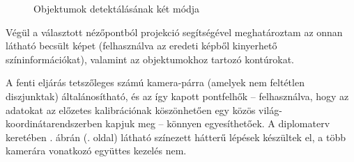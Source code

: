 \begin{figure}[b]

\caption{Objektumok detektálásának két módja \label{fig:plan-objects}}
\end{figure}



Végül a választott nézőpontból projekció segítségével meghatároztam az onnan látható becsült képet (felhasználva az eredeti képből kinyerhető színinformációkat), valamint az objektumokhoz tartozó kontúrokat.

A fenti eljárás tetszőleges számú kamera-párra (amelyek nem feltétlen diszjunktak) általánosítható, és az így kapott pontfelhők -- felhasználva, hogy az adatokat az előzetes kalibrációnak köszönhetően egy közös világ-koordinátarendszerben kapjuk meg -- könnyen egyesíthetőek. A diplomaterv keretében . ábrán (\pageref{fig:of-method}. oldal) látható színezett hátterű lépések készültek el, a több kamerára vonatkozó együttes kezelés nem.

